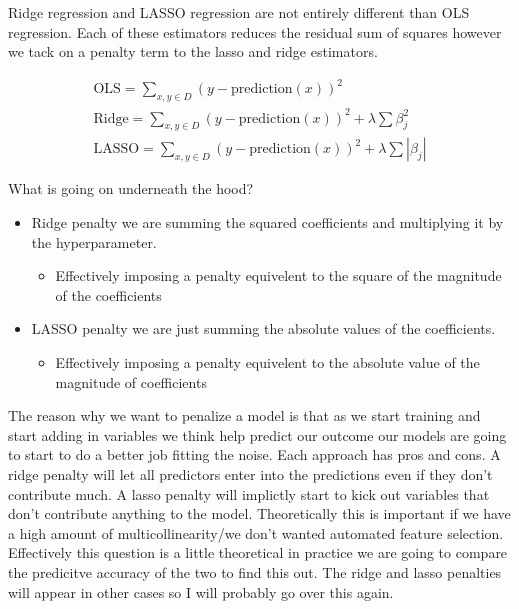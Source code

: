 \documentclass[
  letterpaper,
  DIV=11,
  numbers=noendperiod]{scrreprt}
\providecommand{\tightlist}{%
  \setlength{\itemsep}{0pt}\setlength{\parskip}{0pt}}\usepackage{longtable,booktabs,array}
\begin{document}
Ridge regression and LASSO regression are not entirely different than
OLS regression. Each of these estimators reduces the residual sum of
squares however we tack on a penalty term to the lasso and ridge
estimators.

\begin{align}

\text{OLS} = \sum_{x,y \in D}(y-\text{prediction}(x))^2 \\

\text{Ridge} = \sum_{x,y \in D}(y-\text{prediction}(x))^2 + \lambda \sum \beta^{2}_{j} \\

\text{LASSO} = \sum_{x,y \in D}(y-\text{prediction}(x))^2 + \lambda \sum |{\beta_{j}}|

\end{align}

What is going on underneath the hood?

\begin{itemize}
\tightlist
\item
  Ridge penalty we are summing the squared coefficients and multiplying
  it by the hyperparameter.

  \begin{itemize}
  \tightlist
  \item
    Effectively imposing a penalty equivelent to the square of the
    magnitude of the coefficients
  \end{itemize}
\item
  LASSO penalty we are just summing the absolute values of the
  coefficients.

  \begin{itemize}
  \tightlist
  \item
    Effectively imposing a penalty equivelent to the absolute value of
    the magnitude of coefficients
  \end{itemize}
\end{itemize}

The reason why we want to penalize a model is that as we start training
and start adding in variables we think help predict our outcome our
models are going to start to do a better job fitting the noise. Each
approach has pros and cons. A ridge penalty will let all predictors
enter into the predictions even if they don't contribute much. A lasso
penalty will implictly start to kick out variables that don't contribute
anything to the model. Theoretically this is important if we have a high
amount of multicollinearity/we don't wanted automated feature selection.
Effectively this question is a little theoretical in practice we are
going to compare the predicitve accuracy of the two to find this out.
The ridge and lasso penalties will appear in other cases so I will
probably go over this again.
\end{document}
